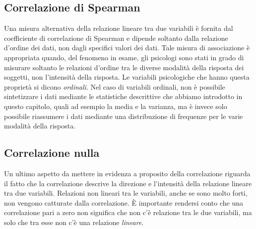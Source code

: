 \documentclass[
  11pt,
  italian,
  a4paper,
  extrafontsizes,onecolumn,openright
  ]{memoir}
\theoremstyle{definition}
\theoremstyle{definition}
\theoremstyle{definition}
\theoremstyle{definition}
\theoremstyle{remark}
\begin{document}
\hypertarget{correlazione-di-spearman}{%
\subsection{Correlazione di Spearman}\label{correlazione-di-spearman}}

Una misura alternativa della relazione lineare tra due variabili è
fornita dal coefficiente di correlazione di Spearman e dipende soltanto
dalla relazione d'ordine dei dati, non dagli specifici valori dei dati.
Tale misura di associazione è appropriata quando, del fenomeno in esame,
gli psicologi sono stati in grado di misurare soltanto le relazioni
d'ordine tra le diverse modalità della risposta dei soggetti, non
l'intensità della risposta. Le variabili psicologiche che hanno questa
proprietà si dicono \emph{ordinali}. Nel caso di variabili ordinali, non è
possibile sintetizzare i dati mediante le statistiche descrittive che
abbiamo introdotto in questo capitolo, quali ad esempio la media e la
varianza, ma è invece solo possibile riassumere i dati mediante una
distribuzione di frequenze per le varie modalità della risposta.

\hypertarget{correlazione-nulla}{%
\subsection{Correlazione nulla}\label{correlazione-nulla}}

Un ultimo aspetto da mettere in evidenza a proposito della correlazione riguarda il fatto che la correlazione descrive la direzione e l'intensità della relazione lineare tra due variabili. Relazioni non lineari tra le variabili, anche se sono molto forti, non vengono catturate dalla correlazione. È importante rendersi conto che una correlazione pari a zero non significa che non c'è relazione tra le due variabili, ma solo che tra esse non c'è una relazione \emph{lineare}.
\end{document}
